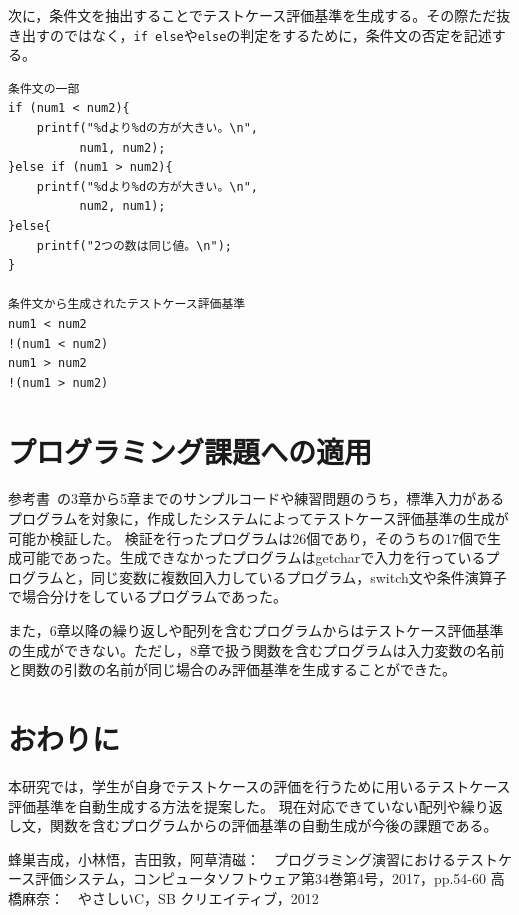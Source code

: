 \documentclass[10pt]{tpu-abst}
\begin{document}
次に，条件文を抽出することでテストケース評価基準を生成する。その際ただ抜き出すのではなく，{\tt if else}や{\tt else}の判定をするために，条件文の否定を記述する。 
\begin{lstlisting}
条件文の一部
if (num1 < num2){
	printf("%dより%dの方が大きい。\n", 
		  num1, num2);
}else if (num1 > num2){
	printf("%dより%dの方が大きい。\n",
		  num2, num1);
}else{
	printf("2つの数は同じ値。\n");
}

条件文から生成されたテストケース評価基準
num1 < num2
!(num1 < num2)
num1 > num2
!(num1 > num2)
\end{lstlisting}
\section{プログラミング課題への適用}
参考書~\cite{b1}の3章から5章までのサンプルコードや練習問題のうち，標準入力があるプログラムを対象に，作成したシステムによってテストケース評価基準の生成が可能か検証した。
検証を行ったプログラムは26個であり，そのうちの17個で生成可能であった。生成できなかったプログラムはgetcharで入力を行っているプログラムと，同じ変数に複数回入力しているプログラム，switch文や条件演算子で場合分けをしているプログラムであった。

また，6章以降の繰り返しや配列を含むプログラムからはテストケース評価基準の生成ができない。ただし，8章で扱う関数を含むプログラムは入力変数の名前と関数の引数の名前が同じ場合のみ評価基準を生成することができた。

\section{おわりに}
本研究では，学生が自身でテストケースの評価を行うために用いるテストケース評価基準を自動生成する方法を提案した。
現在対応できていない配列や繰り返し文，関数を含むプログラムからの評価基準の自動生成が今後の課題である。

\begin{thebibliography}{2}
  {\small 蜂巣吉成，小林悟，吉田敦，阿草清磁：　プログラミング演習におけるテストケース評価システム，コンピュータソフトウェア第34巻第4号，2017，pp.54-60}
  {\small 高橋麻奈：　やさしいC，SB クリエイティブ，2012}
\end{thebibliography}
%
\end{document}
